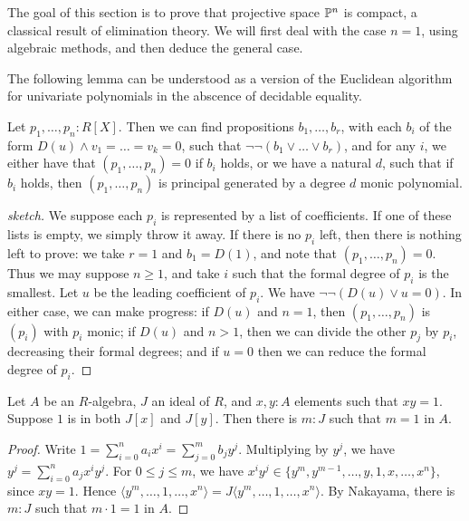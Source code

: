 The goal of this section is to prove that projective space $\mathbb{P}^n$ is compact,
a classical result of elimination theory.
We will first deal with the case $n = 1$, using algebraic methods, and
then deduce the general case.

The following lemma can be understood as a version of the Euclidean algorithm
for univariate polynomials in the abscence of decidable equality.
\begin{proposition}\label{euclid}
  Let $p_1, \ldots, p_n : R[X]$. Then we can find propositions
  $b_1,\ldots,b_r$, with each $b_i$ of the form $D(u) \wedge v_1 = \ldots = v_k = 0$,
  such that $\neg \neg (b_1 \vee \ldots \vee b_r)$,
  and for any $i$, we either have that $(p_1,\ldots,p_n) = 0$ if $b_i$ holds,
  or we have a natural $d$, such that if $b_i$ holds,
  then $(p_1,\ldots,p_n)$ is principal generated by a degree $d$ monic polynomial.
\end{proposition}
\begin{proof}[sketch]
  We suppose each $p_i$ is represented by a list of coefficients.
  If one of these lists is empty, we simply throw it away.
  If there is no $p_i$ left,
  then there is nothing left to prove: we take $r = 1$ and $b_1 = D(1)$,
  and note that $(p_1,\ldots,p_n) = 0$.
  Thus we may suppose $n \ge 1$, and take $i$ such that the formal degree
  of $p_i$ is the smallest. Let $u$ be the leading coefficient of $p_i$.
  We have $\neg \neg (D(u) \vee u = 0)$. 
  In either case, we can make progress: if $D(u)$ and $n = 1$,
  then $(p_1,\ldots,p_n)$ is $(p_i)$ with $p_i$ monic;
  if $D(u)$ and $n > 1$, then we can divide the other $p_j$ by $p_i$,
  decreasing their formal degrees;
  and if $u = 0$ then we can reduce the formal degree of $p_i$.
\end{proof}

\begin{lemma}\label{lorenzen}
  Let $A$ be an $R$-algebra, $J$ an ideal of $R$, and $x, y : A$ elements
  such that $xy = 1$. Suppose $1$ is in both $J[x]$ and $J[y]$.
  Then there is $m : J$  such that $m = 1$ in $A$.
\end{lemma}
\begin{proof}
  Write $1 = \sum_{i=0}^n a_ix^i = \sum_{j=0}^m b_j y^j$.
  Multiplying by $y^j$, we have
  $y^j = \sum_{i=0}^n a_j x^i y^j$.
  For $0 \le j \le m$, we have
  $x^i y^j \in \{y^m,y^{m-1},\ldots,y,1,x,\ldots,x^n\}$, since $xy = 1$.
  Hence $\langle y^m,\ldots,1,\ldots,x^n \rangle = J\langle y^m,\ldots,1,\ldots,x^n\rangle$.
  By Nakayama, there is $m : J$ such that $m \cdot 1 = 1$ in $A$.
\end{proof}

